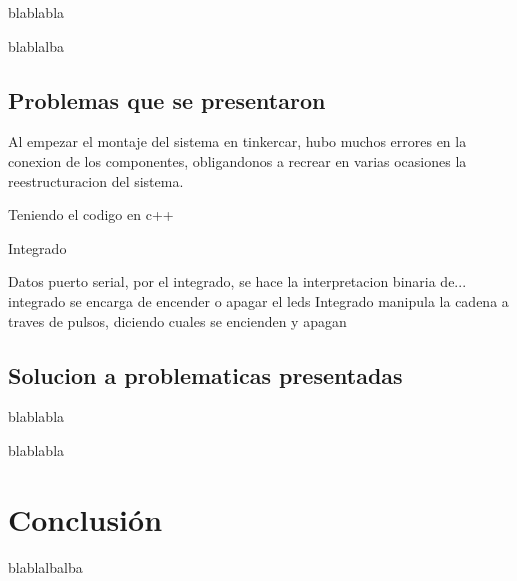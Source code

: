 \documentclass{article}
\begin{document}
blablabla

 \vspace{1cm}
 
blablalba 

 \vspace{1cm}



\subsection{Problemas que se presentaron}


Al empezar el montaje del sistema en tinkercar, hubo muchos errores en la conexion de los componentes, obligandonos a recrear en varias ocasiones la reestructuracion del sistema.
 \vspace{1cm}
 
 Teniendo el codigo en c++ 
 
 Integrado
 
 Datos puerto serial, por el integrado, se hace la interpretacion binaria de... integrado se encarga de encender o apagar el leds
Integrado manipula la cadena a traves de pulsos, diciendo cuales se encienden y apagan



\vspace{5cm}

\subsection{Solucion a problematicas presentadas}

blablabla 

\vspace{1cm}

blablabla

\vspace{8cm}
\section{Conclusión} \label{conclulsion}
blablalbalba

\vspace{1cm}
\end{document}
